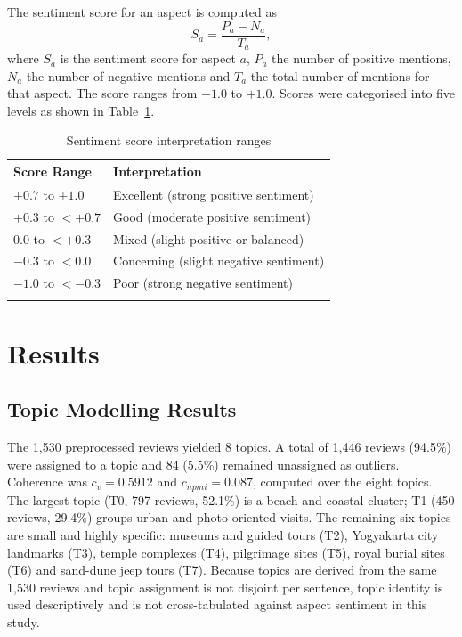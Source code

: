 \documentclass[pdflatex,sn-mathphys-num]{sn-jnl}
\begin{document}
The sentiment score for an aspect is computed as
\begin{equation}
S_a = \frac{P_a - N_a}{T_a},\label{eq1}
\end{equation}
where $S_a$ is the sentiment score for aspect $a$, $P_a$ the number of positive mentions, $N_a$ the number of negative mentions and $T_a$ the total number of mentions for that aspect. The score ranges from $-1.0$ to $+1.0$. Scores were categorised into five levels as shown in Table~\ref{tab4}.

\begin{table}[htbp]
\caption{Sentiment score interpretation ranges}\label{tab4}
\begin{tabular}{@{}ll@{}}
\toprule
Score Range & Interpretation\\
\midrule
$+0.7$ to $+1.0$ & Excellent (strong positive sentiment)\\
$+0.3$ to $<+0.7$ & Good (moderate positive sentiment)\\
$0.0$ to $<+0.3$ & Mixed (slight positive or balanced)\\
$-0.3$ to $<0.0$ & Concerning (slight negative sentiment)\\
$-1.0$ to $<-0.3$ & Poor (strong negative sentiment)\\
\botrule
\end{tabular}
\end{table}

\section{Results}\label{sec4}

\subsection{Topic Modelling Results}\label{subsec5}

The 1,530 preprocessed reviews yielded 8 topics. A total of 1,446 reviews (94.5\%) were assigned to a topic and 84 (5.5\%) remained unassigned as outliers. Coherence was $c_v = 0.5912$ and $c_{npmi} = 0.087$, computed over the eight topics. The largest topic (T0, 797 reviews, 52.1\%) is a beach and coastal cluster; T1 (450 reviews, 29.4\%) groups urban and photo-oriented visits. The remaining six topics are small and highly specific: museums and guided tours (T2), Yogyakarta city landmarks (T3), temple complexes (T4), pilgrimage sites (T5), royal burial sites (T6) and sand-dune jeep tours (T7). Because topics are derived from the same 1,530 reviews and topic assignment is not disjoint per sentence, topic identity is used descriptively and is not cross-tabulated against aspect sentiment in this study.
\end{document}
